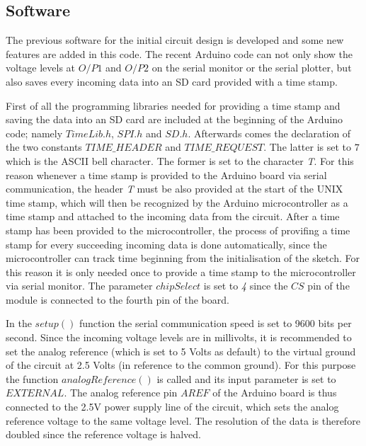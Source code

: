 \subsection{Software}
The previous software for the initial circuit design is developed and some new features are added in this code. The recent Arduino code can not only show the voltage levels at $O/P1$ and $O/P2$ on the serial monitor or the serial plotter, but also saves every incoming data into an SD card provided with a time stamp.\par 
First of all the programming libraries needed for providing a time stamp and saving the data into an SD card are included at the beginning of the Arduino code; namely $TimeLib.h$, $SPI.h$ and $SD.h$. Afterwards comes the declaration of the two constants $TIME\_HEADER$ and $TIME\_REQUEST$. The latter is set to $7$ which is the ASCII bell character. The former is set to the character \textit{T}. For this reason whenever a time stamp is provided to the Arduino board via serial communication, the header \textit{T} must be also provided at the start of the UNIX time stamp, which will then be recognized by the Arduino microcontroller as a time stamp and attached to the incoming data from the circuit. After a time stamp has been provided to the microcontroller, the process of provifing a time stamp for every succeeding incoming data is done automatically, since the microcontroller can track time beginning from the initialisation of the sketch. For this reason it is only needed once to provide a time stamp to the microcontroller via serial monitor. The parameter $chipSelect$ is set to \textit{4} since the $CS$ pin of the module is connected to the fourth pin of the board. \par
In the $setup()$ function the serial communication speed is set to 9600 bits per second. Since the incoming voltage levels are in millivolts, it is recommended to set the analog reference (which is set to 5 Volts as default) to the virtual ground of the circuit at 2.5 Volts (in reference to the common ground). For this purpose the function $analogReference()$ is called and its input parameter is set to $EXTERNAL$. The analog reference pin $AREF$ of the Arduino board is thus connected to the 2.5V power supply line of the circuit, which sets the analog reference voltage to the same voltage level. The resolution of the data is therefore doubled since the reference voltage is halved.\par
